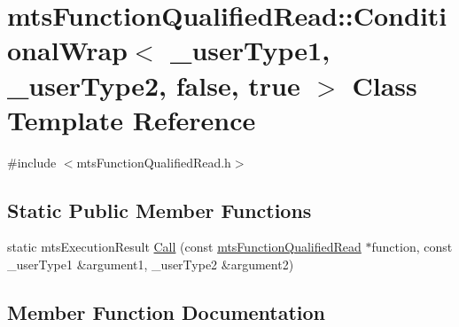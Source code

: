 \hypertarget{classmts_function_qualified_read_1_1_conditional_wrap_3_01__user_type1_00_01__user_type2_00_01false_00_01true_01_4}{}\section{mts\+Function\+Qualified\+Read\+:\+:Conditional\+Wrap$<$ \+\_\+user\+Type1, \+\_\+user\+Type2, false, true $>$ Class Template Reference}
\label{classmts_function_qualified_read_1_1_conditional_wrap_3_01__user_type1_00_01__user_type2_00_01false_00_01true_01_4}


{\ttfamily \#include $<$mts\+Function\+Qualified\+Read.\+h$>$}

\subsection*{Static Public Member Functions}
\begin{DoxyCompactItemize}
\item 
static mts\+Execution\+Result \hyperlink{classmts_function_qualified_read_1_1_conditional_wrap_3_01__user_type1_00_01__user_type2_00_01false_00_01true_01_4_a8fb99e05690297fa1bb2bd571fa2e192}{Call} (const \hyperlink{classmts_function_qualified_read}{mts\+Function\+Qualified\+Read} $\ast$function, const \+\_\+user\+Type1 \&argument1, \+\_\+user\+Type2 \&argument2)
\end{DoxyCompactItemize}


\subsection{Member Function Documentation}
\hypertarget{classmts_function_qualified_read_1_1_conditional_wrap_3_01__user_type1_00_01__user_type2_00_01false_00_01true_01_4_a8fb99e05690297fa1bb2bd571fa2e192}{}
